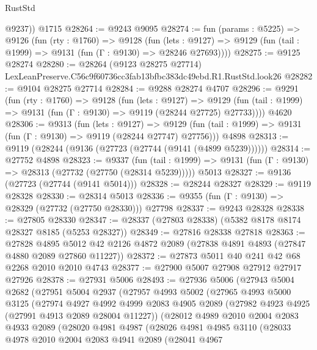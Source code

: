 \begin{lexlean}{RustStd}
\begin{coremodule}
        @9237))
    @1715
@28264 := @9243 @9095
@28274 := fun (params : @5225) =>
  @9126
    (fun (rty : @1760) =>
    @9128
      (fun (lets : @9127) =>
      @9129 (fun (tail : @1999) => @9131 (fun (Γ : @9130) => @28246 @27693))))
@28275 := @9125 @28274
@28280 := @28264
    (@9123 @28275 @27714)
    LexLeanPreserve.C56c9f60736cc3fab13bfbc383dc49ebd.R1.RustStd.look26
@28282 := @9104 @28275 @27714
@28284 := @9288 @28274 @4707
@28296 := @9291
    (fun (rty : @1760) =>
    @9128
      (fun (lets : @9127) =>
      @9129 (fun (tail : @1999) => @9131 (fun (Γ : @9130) => @9119 (@28244 @27725) @27733))))
    @4620
@28306 := @9313
    (fun (lets : @9127) =>
    @9129 (fun (tail : @1999) => @9131 (fun (Γ : @9130) => @9119 (@28244 @27747) @27756)))
    @4898
@28313 := @9119 (@28244 (@9136 (@27723 (@27744 (@9141 (@4899 @5239))))))
@28314 := @27752 @4898
@28323 := @9337
    (fun (tail : @1999) => @9131 (fun (Γ : @9130) => @28313 (@27732 (@27750 (@28314 @5239)))))
    @5013
@28327 := @9136 (@27723 (@27744 (@9141 @5014)))
@28328 := @28244 @28327
@28329 := @9119 @28328
@28330 := @28314 @5013
@28336 := @9355 (fun (Γ : @9130) => @28329 (@27732 (@27750 @28330))) @27798
@28337 := @9243 @28328
@28338 := @27805 @28330
@28347 := @28337 (@27803 @28338) (@5382 @8178 @8174 @28327 @8185 (@5253 @28327))
@28349 := @27816 @28338 @27818
@28363 := @27828
    @4895
    @5012
    @42
    @2126
    @4872
    @2089
    (@27838 @4891 @4893 (@27847 @4880 @2089 @27860 @11227))
@28372 := @27873 @5011 @40 @241 @42 @68 @2268 @2010 @2010 @4743
@28377 := @27900 @5007 @27908 @27912 @27917 @27926
@28378 := @27931 @5006
@28493 := @27936
    @5006
    (@27943
      @5004
      @2682
      (@27951
        @5004
        @2937
        (@27957
          @4993
          @5002
          (@27965
            @4993
            @5000
            @3125
            (@27974
              @4927
              @4992
              @4999
              @2083
              @4905
              @2089
              (@27982 @4923 @4925 (@27991 @4913 @2089 @28004 @11227))
              (@28012
                @4989
                @2010
                @2004
                @2083
                @4933
                @2089
                (@28020
                  @4981
                  @4987
                  (@28026
                    @4981
                    @4985
                    @3110
                    (@28033
                      @4978
                      @2010
                      @2004
                      @2083
                      @4941
                      @2089
                      (@28041
                        @4967

\end{coremodule}
\end{lexlean}
